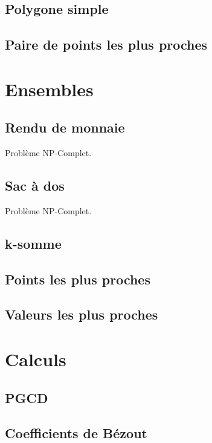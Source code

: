 \documentclass[8pt]{article}
\begin{document}
        \subsection{Polygone simple}
        {\scriptsize}
        \subsection{Paire de points les plus proches}
    \section{Ensembles}
        \subsection{Rendu de monnaie}
        Problème NP-Complet.
        {\scriptsize}
        \subsection{Sac à dos}
        Problème NP-Complet.
        {\scriptsize}
        \subsection{k-somme}
        \subsection{Points les plus proches}
        {\scriptsize}
        \subsection{Valeurs les plus proches}
        {\scriptsize}
    \section{Calculs}
        \subsection{PGCD}
        {\scriptsize}
        \subsection{Coefficients de Bézout}
        {\scriptsize}
\end{document}
